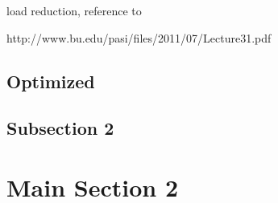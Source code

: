 load reduction, reference to

http://www.bu.edu/pasi/files/2011/07/Lecture31.pdf


\subsection{Optimized}



\subsection{Subsection 2}


\section{Main Section 2}
